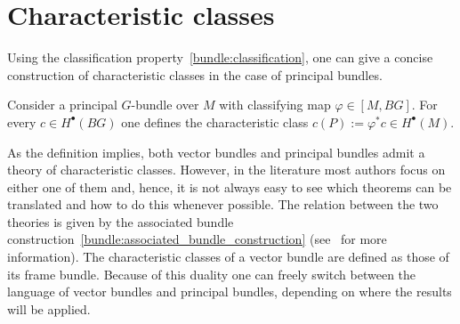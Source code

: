 \section{Characteristic classes}


    Using the classification property~\ref{bundle:classification}, one can give a concise construction of characteristic classes in the case of principal bundles.
    \begin{construct}
        Consider a principal $G$-bundle over $M$ with classifying map $\varphi\in[M,BG]$. For every $c\in H^\bullet(BG)$ one defines the characteristic class $c(P):=\varphi^*c\in H^\bullet(M)$.
    \end{construct}

    As the definition implies, both vector bundles and principal bundles admit a theory of characteristic classes. However, in the literature most authors focus on either one of them and, hence, it is not always easy to see which theorems can be translated and how to do this whenever possible. The relation between the two theories is given by the associated bundle construction~\ref{bundle:associated_bundle_construction} (see~\citet{sorensen_introduction_2017} for more information). The characteristic classes of a vector bundle are defined as those of its frame bundle. Because of this duality one can freely switch between the language of vector bundles and principal bundles, depending on where the results will be applied.

